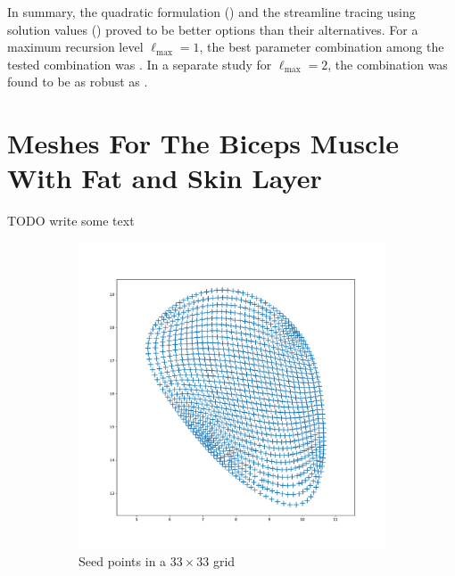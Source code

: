 In summary, the quadratic formulation () and the streamline tracing using solution values () proved to be better options than their alternatives. For a maximum recursion level $\ell_\text{max}=1$, the best parameter combination among the tested combination was . In a separate study for $\ell_\text{max}=2$, the combination  was found to be as robust as .


\section{Meshes For The Biceps Muscle With Fat and Skin Layer}

TODO write some text



\begin{figure}[H]
  \centering%
  \begin{subfigure}[t]{0.48\textwidth}%
    \centering%
    \includegraphics[width=\textwidth]{images/parallel_fiber_estimation/left_biceps_brachii_33x33fibers_bin_csv.pdf}%
    \caption{Seed points in a $33\times 33$ grid}%
    \label{fig:2_multidomain}%
  \end{subfigure}
  \quad
  \begin{subfigure}[t]{0.48\textwidth}%
    \centering%

\end{subfigure}
\end{figure}
